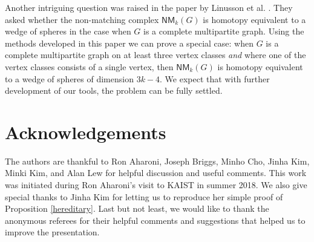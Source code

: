\documentclass[10pt]{amsart}
\theoremstyle{definition}
\begin{document}
	\vspace{1ex}
	
	Another intriguing question was raised in the paper by Linusson et al. \cite{linusson_bounded_matching_complex}. They asked whether the non-matching complex $\mathsf{NM}_k(G)$ is homotopy equivalent to a wedge of spheres in the case when $G$ is a complete multipartite graph. Using  the methods developed in this paper we can prove a special case: when $G$ is a complete multipartite graph on at least three vertex classes {\em and} where one of the vertex classes consists of a single vertex, then $\mathsf{NM}_k(G)$ is homotopy equivalent to a wedge of spheres of dimension $3k-4$. We expect that with further development of our tools, the problem can be fully settled. 
	
	\section*{Acknowledgements}
	The authors are thankful to Ron Aharoni, Joseph Briggs, Minho Cho, Jinha Kim, Minki Kim, and Alan Lew for helpful discussion and useful comments. This work was initiated during Ron Aharoni's visit to KAIST in summer 2018. We also give special thanks to Jinha Kim for letting us to reproduce her simple proof of Proposition \ref{hereditary}. Last but not least, we would like to thank the anonymous referees for their helpful comments and suggestions that helped us to improve the presentation.  
	
	
	
	
	
	
	
\end{document}
